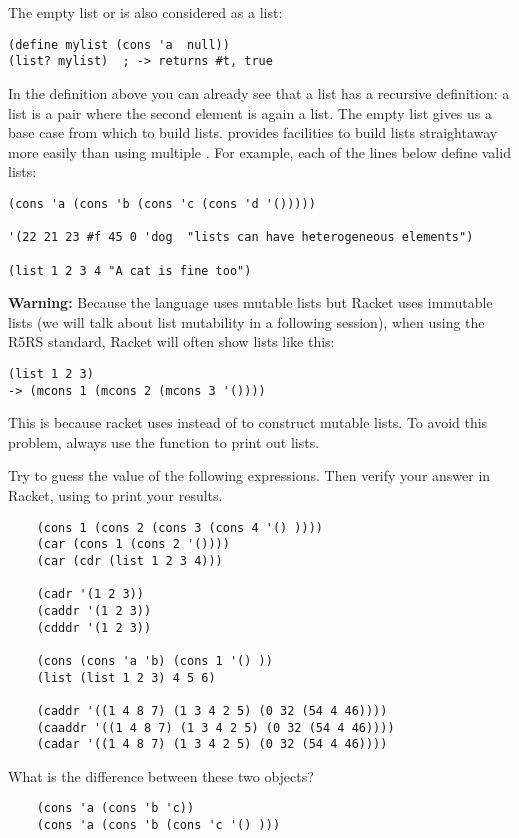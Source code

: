 \documentclass{../../../tp}
\begin{document}
The empty list  or  is also considered as a list:
\begin{verbatim}
(define mylist (cons 'a  null))
(list? mylist) 	; -> returns #t, true
\end{verbatim}

In the definition above you can already see that a list has a recursive definition: a list is a pair where the second element is again a list. The empty list  gives us a base case from which to build lists. \scheme provides facilities to build lists straightaway more easily than using multiple . For example, each of the lines below define valid lists:

\begin{verbatim}
(cons 'a (cons 'b (cons 'c (cons 'd '()))))

'(22 21 23 #f 45 0 'dog  "lists can have heterogeneous elements")

(list 1 2 3 4 "A cat is fine too")
\end{verbatim}

\textbf{Warning:} Because the \scheme language uses mutable lists but Racket uses immutable lists (we will talk about list mutability in a following session), when using the R5RS standard, Racket will often show lists like this:

\begin{verbatim}
(list 1 2 3)
-> (mcons 1 (mcons 2 (mcons 3 '())))
\end{verbatim}

This is because racket uses  instead of  to construct mutable lists. To avoid this problem, always use the  function to print out lists.

\begin{instruction}
Try to guess the value of the following expressions. Then verify your answer in Racket, using  to print your results.

\begin{verbatim}
	(cons 1 (cons 2 (cons 3 (cons 4 '() ))))
	(car (cons 1 (cons 2 '())))
	(car (cdr (list 1 2 3 4)))
	
	(cadr '(1 2 3))
	(caddr '(1 2 3))
	(cdddr '(1 2 3))
	
	(cons (cons 'a 'b) (cons 1 '() ))
	(list (list 1 2 3) 4 5 6)
	
	(caddr '((1 4 8 7) (1 3 4 2 5) (0 32 (54 4 46))))
	(caaddr '((1 4 8 7) (1 3 4 2 5) (0 32 (54 4 46))))
	(cadar '((1 4 8 7) (1 3 4 2 5) (0 32 (54 4 46))))
\end{verbatim}
	
What is the difference between these two objects?
		
	\begin{verbatim}
	(cons 'a (cons 'b 'c))
	(cons 'a (cons 'b (cons 'c '() ))) 	
	\end{verbatim}
			
\end{instruction}
\end{document}
